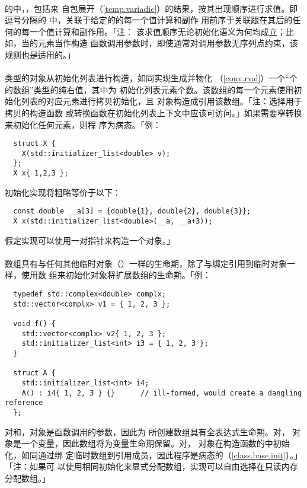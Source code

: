 \paragraph{}
的中，，包括来
自包展开（\ref{temp.variadic}）的结果，按其出现顺序进行求值。即逗号分隔的
中，关联于给定的的每一个值计算和副作
用前序于关联跟在其后的任何的每一个值计算和副作用。「注：
该求值顺序无论初始化语义为何均成立；比如，当的元素当作构造
函数调用参数时，即使通常对调用参数无序列点约束，该规则也是适用的。」

\paragraph{}
类型的对象从初始化列表进行构造，如同实现生成并物化
（\ref{conv.rval}）一个``个的数组''类型的纯右值，其中为
初始化列表元素个数。该数组的每一个元素使用初始化列表的对应元素进行拷贝初始化，且
对象构造成引用该数组。「注：选择用于拷贝的构造函数
或转换函数在初始化列表上下文中应该可访问。」如果需要窄转换来初始化任何元素，则程
序为病态。「例：
\begin{lstlisting}
  struct X {
    X(std::initializer_list<double> v);
  };
  X x{ 1,2,3 };
\end{lstlisting}
初始化实现将粗略等价于以下：
\begin{lstlisting}
  const double __a[3] = {double{1}, double{2}, double{3}};
  X x(std::initializer_list<double>(__a, __a+3));
\end{lstlisting}
假定实现可以使用一对指针来构造一个对象。」

\paragraph{}
数组具有与任何其他临时对象（）一样的生命期，除了与绑定引用到临时对象一样，使用数
组来初始化对象将扩展数组的生命期。「例：
\begin{lstlisting}
  typedef std::complex<double> complx;
  std::vector<complx> v1 = { 1, 2, 3 };

  void f() {
    std::vector<complx> v2{ 1, 2, 3 };
    std::initializer_list<int> i3 = { 1, 2, 3 };
  }

  struct A {
    std::initializer_list<int> i4;
    A() : i4{ 1, 2, 3 } {}      // ill-formed, would create a dangling reference
  };
\end{lstlisting}
对和，对象是函数调用的参数，因此为
所创建数组具有全表达式生命期。对，
对象是一个变量，因此数组将为变量生命期保留。对，
对象在构造函数的中初始化，如同通过绑
定临时数组到引用成员，因此程序是病态的（\ref{class.base.init}）。」「注：如果可
以使用相同初始化来显式分配数组，实现可以自由选择在只读内存分配数组。」

